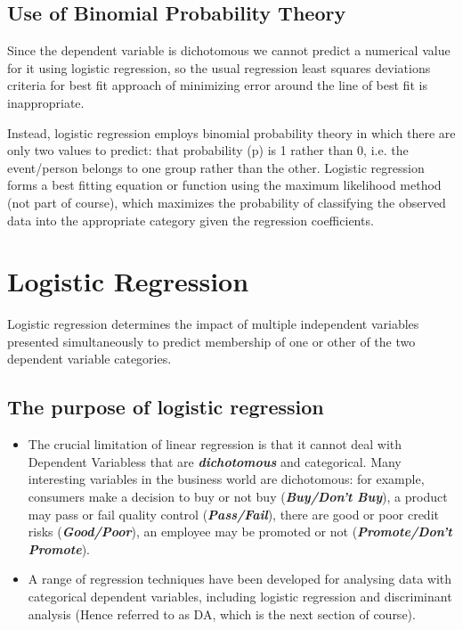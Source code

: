 \documentclass[a4paper,12pt]{article}
\begin{document}
{\subsection{Use of Binomial Probability Theory}
Since the dependent variable is dichotomous we cannot predict a numerical value for it
using logistic regression, so the usual regression least squares deviations criteria for best fit
approach of minimizing error around the line of best fit is inappropriate.

Instead, logistic regression employs binomial probability theory in which there are only two values to
predict: that probability (p) is 1 rather than 0, i.e. the event/person belongs to one group
rather than the other. Logistic regression forms a best fitting equation or function using the
maximum likelihood method (not part of course), which maximizes the probability of classifying the observed
data into the appropriate category given the regression coefficients.

\newpage
\section{Logistic Regression}
Logistic regression determines the impact of multiple independent variables
presented simultaneously to predict membership of one or other of the two
dependent variable categories.

\subsection{The purpose of logistic regression}
\begin{itemize}
	\item The crucial limitation of linear regression is that it cannot deal with Dependent Variabless that are \textbf{\textit{dichotomous}} and categorical. Many interesting variables in the business world are dichotomous: for
	example, consumers make a decision to buy or not buy (\textit{\textbf{Buy/Don't Buy}}), a product may pass or fail quality control (\textit{\textbf{Pass/Fail}}), there are good or poor credit risks (\textit{\textbf{Good/Poor}}), an employee may be promoted or not (\textit{\textbf{Promote/Don't Promote}}).
	
	\item 	A range of regression techniques have been developed for analysing data with categorical dependent
	variables, including logistic regression and discriminant analysis (Hence referred to as DA, which is the next section of course).
	

\end{itemize}}
\end{document}
